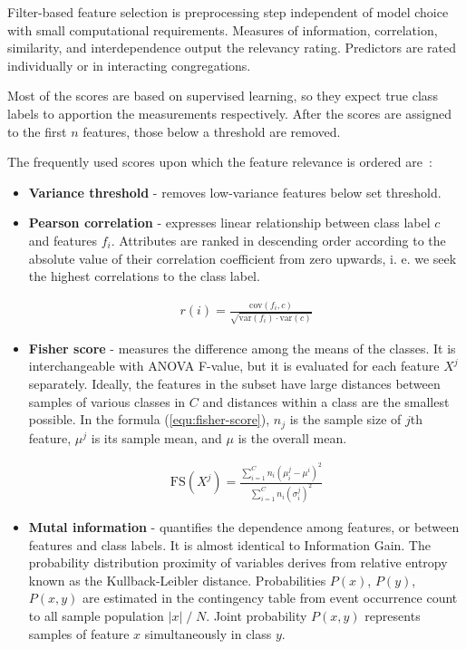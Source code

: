 Filter-based feature selection is preprocessing step independent of model choice with small computational requirements. Measures of information, correlation, similarity, and interdependence output the relevancy rating. Predictors are rated individually or in interacting congregations. 

Most of the scores are based on supervised learning, so they expect true class labels to apportion the measurements respectively. After the scores are assigned to the first $n$ features, those below a threshold are removed. 

The frequently used scores upon which the feature relevance is ordered are~\cite{nandi_condition_2019}: 
\begin{itemize}
\item \textbf{Variance threshold} - removes low-variance features below set threshold.
\item \textbf{Pearson correlation} - expresses linear relationship between class label $c$ and features $f_i$. Attributes are ranked in descending order according to the absolute value of their correlation coefficient from zero upwards, i. e. we seek the highest correlations to the class label.
\begin{ceqn}\begin{align}
r(i) = \frac{\mathrm{cov}(f_i, c)}{\sqrt{\mathrm{var}(f_i) \cdot \mathrm{var}(c)}}
\end{align}\end{ceqn}

\item \textbf{Fisher score} - measures the difference among the means of the classes. It is interchangeable with ANOVA F-value, but it is evaluated for each feature $X^j$ separately. Ideally, the features in the subset have large distances between samples of various classes in $C$ and distances within a class are the smallest possible. In the formula (\ref{equ:fisher-score}), $n_j$ is the sample size of $j$th feature, $\mu^j$ is its sample mean, and $\mu$ is the overall mean.

\begin{ceqn}\begin{align}
\mathrm{FS}(X^j) = \frac{\sum_{i=1}^{C} n_i(\mu_i^j - \mu^i)^2}{\sum_{i=1}^{C} n_i (\sigma_i^j)^2}
\label{equ:fisher-score}
\end{align}\end{ceqn}

\item \textbf{Mutal information} - quantifies the dependence among features, or between features and class labels. It is almost identical to Information Gain. The probability distribution proximity of variables derives from relative entropy known as the Kullback-Leibler distance. Probabilities $P(x)$, $P(y)$, $P(x, y)$ are estimated in the contingency table from event occurrence count to all sample population $|x|\;/\;N$. Joint probability $P(x, y)$ represents samples of feature $x$ simultaneously in class $y$.


\end{itemize}
